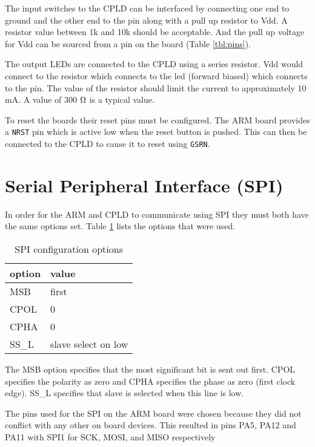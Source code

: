 \documentclass{article}
\begin{document}
The input switches to the CPLD can be interfaced by connecting
one end to ground and the other end to the pin along with a
pull up resistor to Vdd.
A resistor value between 1k and 10k should be acceptable.
And the pull up voltage for Vdd can be sourced from a pin on
the board (Table \ref{tbl:pins}).

The output LEDs are connected to the CPLD using a series
resistor.
Vdd would connect to the resistor which connects to the led
(forward biased) which connects to the pin.
The value of the resistor should limit the current to approximately
10 mA.
A value of 300 $\ohm$ is a typical value.

To reset the boards their reset pins must be configured.
The ARM board provides a \verb+NRST+ pin which is active
low when the reset button is pushed\cite[Pg. 17, 20]{UM1079}.
This can then be connected to the CPLD to cause
it to reset using \verb+GSRN+\citetext{\citealp[Pg. 46, 50]{DS1002}; \citealp[Pg. 8]{EB66}}.


\section{Serial Peripheral Interface (SPI)}

In order for the ARM and CPLD to communicate using SPI\citetext{ \citealp[Pg. 278]{cady2009microcontrollers}; \citealp[Pg. 665]{STRM0038}}
they must both have the same options set.
Table \ref{tbl:spi} lists the options that were used.

\begin{table}
\center
\begin{tabular}{|l|l|}
	\hline
	option & value \\
	\hline
	MSB & first \\
	CPOL & 0 \\
	CPHA & 0 \\
	SS\_L & slave select on low \\
	\hline
\end{tabular}
\caption{SPI configuration options}
\label{tbl:spi}
\end{table}

The MSB option specifies that the most significant bit is sent
out first.
CPOL specifies the polarity as zero and CPHA specifies the phase
as zero (first clock edge).
SS\_L specifies that slave is selected when this line is low.

The pins used for the SPI on the ARM board were chosen because
they did not conflict with any other on board devices.
This resulted in pins PA5, PA12 and PA11 with SPI1 for SCK, MOSI,
and MISO respectively\cite[Pg. 24]{UM1079}
\end{document}
